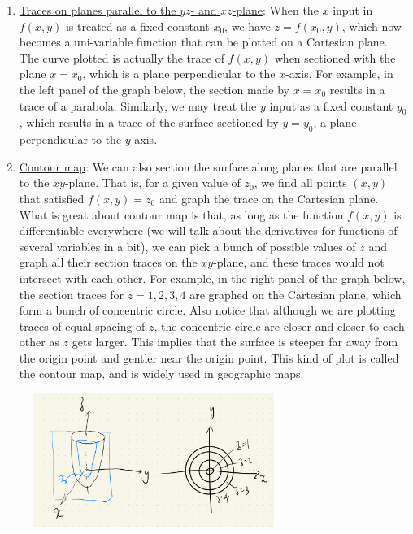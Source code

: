 \begin{enumerate}
    \item \underline{Traces on planes parallel to the $yz$- and $xz$-plane}: When the $x$ input in $f(x, y)$ is treated as a fixed constant $x_0$, we have $z = f(x_0, y)$, which now becomes a uni-variable function that can be plotted on a Cartesian plane.  The curve plotted is actually the trace of $f(x, y)$ when sectioned with the plane $x = x_0$, which is a plane perpendicular to the $x$-axis.  For example, in the left panel of the graph below, the section made by $x = x_0$ results in a trace of a parabola.  Similarly, we may treat the $y$ input as a fixed constant $y_0$, which results in a trace of the surface sectioned by $y=y_0$, a plane perpendicular to the $y$-axis. 
    \item \underline{Contour map}: We can also section the surface along planes that are parallel to the $xy$-plane.  That is, for a given value of $z_0$, we find all points $(x,y)$ that satisfied $f(x,y) = z_0$ and graph the trace on the Cartesian plane.  What is great about contour map is that, as long as the function $f(x,y)$ is differentiable everywhere (we will talk about the derivatives for functions of several variables in a bit), we can pick a bunch of possible values of $z$ and graph all their section traces on the $xy$-plane, and these traces would not intersect with each other.  For example, in the right panel of the graph below, the section traces for $z=1, 2, 3, 4$ are graphed on the Cartesian plane, which form a bunch of concentric circle.  Also notice that although we are plotting traces of equal spacing of $z$, the concentric circle are closer and closer to each other as $z$ gets larger.  This implies that the surface is steeper far away from the origin point and gentler near the origin point.  This kind of plot is called the contour map, and is widely used in geographic maps. 
\end{enumerate}

\begin{figure}[ht]
    \centering
    \includegraphics[width = 0.7\textwidth]{figures/chap 08/3D-graph.png}
\end{figure}

